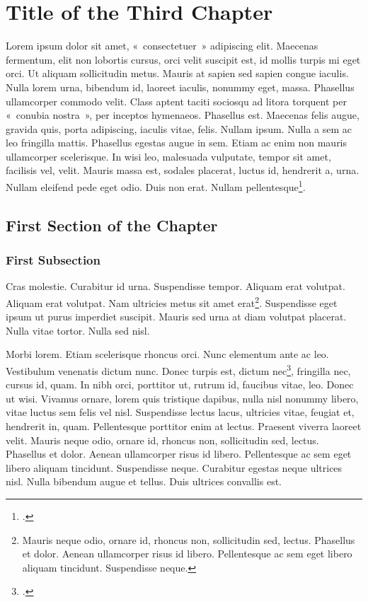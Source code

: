 \chapter{Title of the Third Chapter}

Lorem ipsum dolor sit amet, «~consectetuer~» adipiscing elit. Maecenas fermentum, elit non lobortis cursus, orci velit suscipit est, id mollis turpis mi eget orci. Ut aliquam sollicitudin metus. Mauris at sapien sed sapien congue iaculis. Nulla lorem urna, bibendum id, laoreet iaculis, nonummy eget, massa. Phasellus ullamcorper commodo velit. Class aptent taciti sociosqu ad litora torquent per «~conubia nostra~», per inceptos hymenaeos. Phasellus est. Maecenas felis augue, gravida quis, porta adipiscing, iaculis vitae, felis. Nullam ipsum. Nulla a sem ac leo fringilla mattis. Phasellus egestas augue in sem. Etiam ac enim non mauris ullamcorper scelerisque. In wisi leo, malesuada vulputate, tempor sit amet, facilisis vel, velit. Mauris massa est, sodales placerat, luctus id, hendrerit a, urna. Nullam eleifend pede eget odio. Duis non erat. Nullam pellentesque\footcite[225]{Doule1887}.

\section{First Section of the Chapter}

\subsection{First Subsection}

Cras molestie. Curabitur id urna. Suspendisse tempor. Aliquam erat volutpat. Aliquam erat volutpat. Nam ultricies metus sit amet erat\footnote{Mauris neque odio, ornare id, rhoncus non, sollicitudin sed, lectus. Phasellus et dolor. Aenean ullamcorper risus id libero. Pellentesque ac sem eget libero aliquam tincidunt. Suspendisse neque.}. Suspendisse eget ipsum ut purus imperdiet suscipit. Mauris sed urna at diam volutpat placerat. Nulla vitae tortor. Nulla sed nisl.

Morbi lorem. Etiam scelerisque rhoncus orci. Nunc elementum ante ac leo. Vestibulum venenatis dictum nunc. Donec turpis est, dictum nec\footcite[228]{Drocher2006}, fringilla nec, cursus id, quam. In nibh orci, porttitor ut, rutrum id, faucibus vitae, leo. Donec ut wisi. Vivamus ornare, lorem quis tristique dapibus, nulla nisl nonummy libero, vitae luctus sem felis vel nisl. Suspendisse lectus lacus, ultricies vitae, feugiat et, hendrerit in, quam. Pellentesque porttitor enim at lectus. Praesent viverra laoreet velit. Mauris neque odio, ornare id, rhoncus non, sollicitudin sed, lectus. Phasellus et dolor. Aenean ullamcorper risus id libero. Pellentesque ac sem eget libero aliquam tincidunt. Suspendisse neque. Curabitur egestas neque ultrices nisl. Nulla bibendum augue et tellus. Duis ultrices convallis est.

